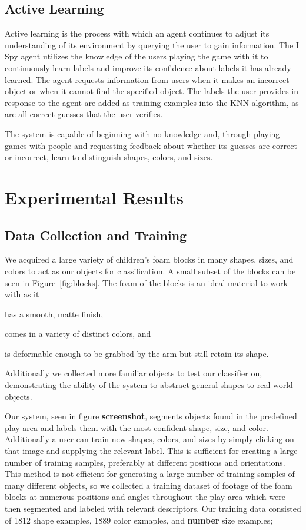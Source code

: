 \documentclass[11pt]{article}
\newcommand{\meh}[1]{{\bf \color{blue} #1}}
\begin{document}
\subsection{Active Learning}
Active learning is the process with which an agent continues to adjust its
understanding of its environment by querying the user to gain information.
The I Spy agent utilizes the knowledge of the users playing the game with it
to continuously learn labels and improve its confidence about labels it has
already learned. The agent requests information from users when it makes an
incorrect object or when it cannot find the specified object. The labels the
user provides in response to the agent are added as training examples into the
KNN algorithm, as are all correct guesses that the user verifies.

The system is capable of beginning with no knowledge and, through playing games
with people and requesting feedback about whether its guesses are correct or
incorrect, learn to distinguish shapes, colors, and sizes.

\section{Experimental Results}

\subsection{Data Collection and Training}
We acquired a large variety of children's foam blocks in many shapes, sizes,
and colors to act as our objects for classification. A small subset of the
blocks can be seen in Figure~\ref{fig:blocks}. The foam of the blocks is an
ideal material to work with as it
\begin{inparaenum}[(1)]
\item has a smooth, matte finish,
\item comes in a variety of distinct colors, and
\item is deformable enough to be grabbed by the arm but still retain its
shape.
\end{inparaenum}
Additionally we collected
more familiar objects to test our classifier on, demonstrating the ability of
the system to abstract general shapes to real world objects.

Our system, seen in figure \meh{screenshot}, segments objects found in the
predefined play area and labels them with the most confident shape, size, and
color.  Additionally a user can train new shapes, colors, and sizes by simply
clicking on that image and supplying the relevant label.  This is sufficient
for creating a large number of training samples, preferably at different
positions and orientations.  This method is not efficient for generating a
large number of training samples of many different objects, so we collected a
training dataset of footage of the foam blocks at numerous positions and angles
throughout the play area which were then segmented and labeled with relevant
descriptors.  Our training data consisted of 1812 shape examples, 1889 color exmaples, and \meh{number} size examples;
\end{document}
